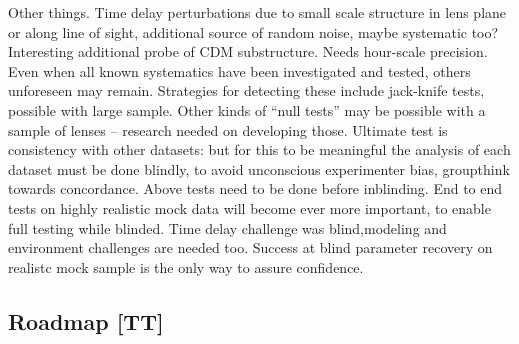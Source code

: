 Other things. Time delay perturbations due to small scale structure in
lens plane or along line of sight, additional source of random noise,
maybe systematic too? Interesting additional probe of CDM substructure.
Needs hour-scale precision. Even when all known systematics have been
investigated and tested, others unforeseen may remain. Strategies for
detecting these include jack-knife tests, possible with large sample.
Other kinds
of ``null tests'' may be possible with a sample of lenses -- research needed
on developing those.
Ultimate test is consistency with other datasets: but for this to be
meaningful the analysis of each dataset must be done blindly, to avoid
unconscious experimenter bias, groupthink towards concordance.  Above
tests need to be done before inblinding.
End to end tests on highly realistic mock data will become ever more
important, to enable full testing while blinded. Time delay challenge
was blind,modeling and environment challenges are needed too. Success
at blind parameter recovery on realistc mock sample is the only way
to assure confidence.



\subsection{Roadmap [TT]}
\label{ssec:roadmap}

